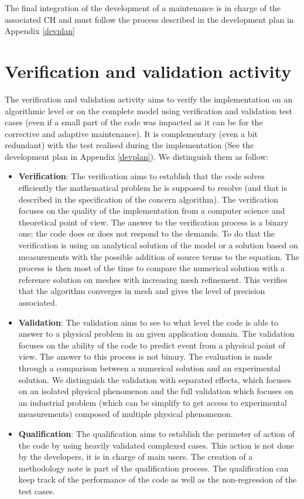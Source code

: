 The final integration of the development of a maintenance is in
charge of the associated CH and must follow the process described in the
development plan in Appendix \ref{devplan}

\section{Verification and validation activity}
\label{vv}
The verification and validation activity aims to verify the implementation on
an algorithmic level or on the complete model using verification and validation
test cases (even if a small part of the code was impacted as it can be for the
corrective and adaptive maintenance). It is complementary (even a bit
redundant) with the test realised during the implementation (See the
development plan in Appendix \ref{devplan}). We distinguish them as follow:
\begin{itemize}
\item \textbf{Verification}: The verification aims to establish that the code
solves efficiently the mathematical problem he is supposed to resolve (and that
is described in the specification of the concern algorithm). The verification
focuses on the quality of the implementation from a computer science and
theoretical point of view. The answer to the verification process is a binary
one: the code does or does not respond to the demands. To do that the
verification is using an analytical solution of the model or a solution based
on measurements with the possible addition of source terms to the equation. The
process is then most of the time to compare the numerical solution with a
reference solution on meshes with increasing mesh refinement. This verifies
that the algorithm converges in mesh and gives the level of precision
associated.
\item \textbf{Validation}: The validation aims to see to what level the code is
able to answer to a physical problem in an given application domain.  The
validation focuses on the ability of the code to predict event from a physical
point of view. The answer to this process is not binary. The evaluation is made
through a comparison between a numerical solution and an experimental solution.
We distinguish the validation with separated effects, which focuses on an
isolated physical phenomenon and the full validation which focuses on an
industrial problem (which can be simplify to get access to experimental
measurements) composed of multiple physical phenomenon.
\item \textbf{Qualification}: The qualification aims to establish the perimeter
of action of the code by using heavily validated complexed cases. This action
is not done by the developers, it is in charge of main users. The creation of a
methodology note is part of the qualification process. The qualification can
keep track of the performance of the code as well as the non-regression of the
test cases.
\end{itemize}

